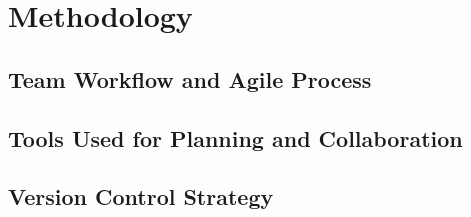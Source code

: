 \chapter{Methodology}
\section{Team Workflow and Agile Process}
\section{Tools Used for Planning and Collaboration}
\section{Version Control Strategy}
